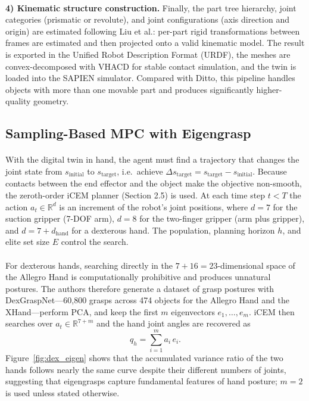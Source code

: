 \documentclass[12pt,a4paper,final]{extreport}
\begin{document}
\paragraph{} \textbf{4) Kinematic structure construction.} Finally, the part tree hierarchy, joint categories (prismatic or revolute), and joint configurations (axis direction and origin) are estimated following Liu et al.: per-part rigid transformations between frames are estimated and then projected onto a valid kinematic model. The result is exported in the Unified Robot Description Format (URDF), the meshes are convex-decomposed with VHACD for stable contact simulation, and the twin is loaded into the SAPIEN simulator. Compared with Ditto, this pipeline handles objects with more than one movable part and produces significantly higher-quality geometry.

\subsection{Sampling-Based MPC with Eigengrasp}

\paragraph{} With the digital twin in hand, the agent must find a trajectory that changes the joint state from $s_{\mathrm{initial}}$ to $s_{\mathrm{target}}$, i.e.\ achieve $\Delta s_{\mathrm{target}}=s_{\mathrm{target}}-s_{\mathrm{initial}}$. Because contacts between the end effector and the object make the objective non-smooth, the zeroth-order iCEM planner (Section 2.5) is used. At each time step $t<T$ the action $a_t\in\mathbb{R}^{d}$ is an increment of the robot's joint positions, where $d=7$ for the suction gripper (7-DOF arm), $d=8$ for the two-finger gripper (arm plus gripper), and $d=7+d_{\mathrm{hand}}$ for a dexterous hand. The population, planning horizon $h$, and elite set size $E$ control the search.

\paragraph{} For dexterous hands, searching directly in the $7+16=23$-dimensional space of the Allegro Hand is computationally prohibitive and produces unnatural postures. The authors therefore generate a dataset of grasp postures with DexGraspNet---60{,}800 grasps across 474 objects for the Allegro Hand and the XHand---perform PCA, and keep the first $m$ eigenvectors $e_1,\ldots,e_m$. iCEM then searches over $a_t\in\mathbb{R}^{7+m}$ and the hand joint angles are recovered as
\begin{equation}
q_h=\sum_{i=1}^{m} a_i\, e_i .
\end{equation}
Figure~\ref{fig:dex_eigen} shows that the accumulated variance ratio of the two hands follows nearly the same curve despite their different numbers of joints, suggesting that eigengrasps capture fundamental features of hand posture; $m=2$ is used unless stated otherwise.
\end{document}
